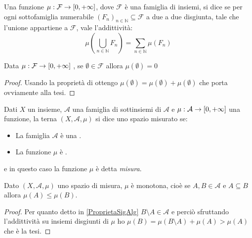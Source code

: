 \begin{definition}[{\sigadd[ità]}]
	Una funzione $\mu:\mathcal F\to [0,+\infty]$, dove $\mathcal F$ è una famiglia di insiemi, si dice \sigadd{} se per ogni sottofamiglia numerabile $(F_n)_{n\in\mathbb N}\subseteq \mathcal F$ a due a due disgiunta, tale che l'unione appartiene a $\mathcal F$, vale l'addittività:
	\begin{equation*}
		\mu\left(\bigcup_{n\in\mathbb N}F_n \right)=\sum_{n\in\mathbb N} \mu(F_n) 
	\end{equation*}
\end{definition}
\begin{remark}
	Data $\mu:\mathcal F\to [0,+\infty]$ \sigadd{}, se $\emptyset\in \mathcal F$ allora $\mu(\emptyset)=0$
\end{remark}
\begin{proof}
	Usando la proprietà di \sigadd[ità] ottengo $\mu(\emptyset)=\mu(\emptyset)+\mu(\emptyset)$ che porta ovviamente alla tesi.
\end{proof}


\begin{definition}
	Dati $X$ un insieme, $\mathcal A$ una famiglia di sottinsiemi di $\mathcal A$ e $\mu:\mathcal A\to [0,+\infty]$ una funzione, la terna $(X,\mathcal A, \mu)$ si dice uno spazio misurato se:
	\begin{itemize}
		\item La famiglia $\mathcal A$ è una \sigalg{}.
		\item La funzione $\mu$ è \sigadd{}.
	\end{itemize}
	e in questo caso la funzione $\mu$ è detta \emph{misura}.
\end{definition}

\begin{remark}\label{MonotoniaMisura}
	Dato $(X,\mathcal A,\mu)$ uno spazio di misura, $\mu$ è monotona, cioè se $A,B\in\mathcal A$ e $A\subseteq B$ allora $\mu(A)\le \mu(B)$.
\end{remark}
\begin{proof}
	Per quanto detto in \cref{ProprietaSigAlg} $B\setminus A\in\mathcal A$ e perciò sfruttando l'addittività su insiemi disgiunti di $\mu$ ho $\mu(B)=\mu(B\setminus A)+\mu(A)>\mu(A)$ che è la tesi.
\end{proof}



